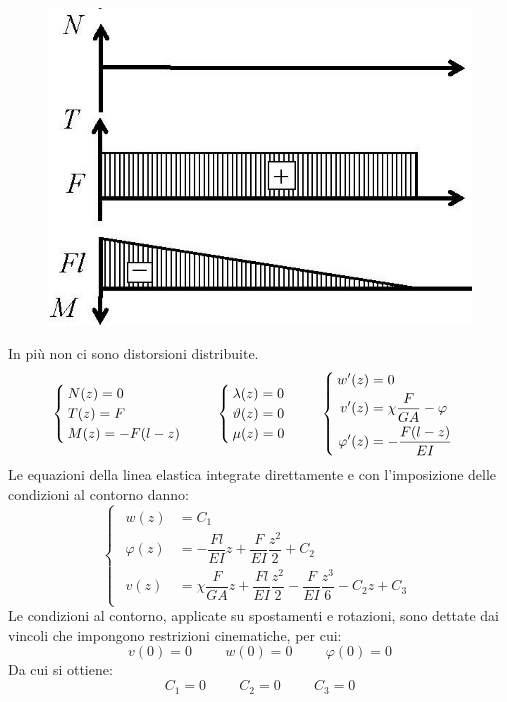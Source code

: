 \documentclass{article}
\begin{document}
\begin{adjustwidth}{2in}{}
\begin{figure}[H]
	\centering
	\includegraphics[width=0.3\linewidth]{"immagini/1.PARTE8_Pagina_13"}
\end{figure}
		In più non ci sono distorsioni distribuite.
		\[
		\begin{cases}
			N(z) = 0 \\
			T(z) = F \\
			M(z) = -F(l-z)
		\end{cases} \hspace{0.5cm} 
		\begin{cases}
			\lambda(z) = 0 \\
			\vartheta(z)= 0 \\
			\mu(z) = 0
		\end{cases} \hspace{0.5cm} 
		\begin{cases}
			\begin{aligned}
				w'(z) & = 0 \\
				v'(z) & = \chi\dfrac{F}{GA} -\varphi \\
				\varphi'(z) & = -\dfrac{F(l-z)}{EI}
			\end{aligned}
		\end{cases}
		\]
		Le equazioni della linea elastica integrate direttamente e con l'imposizione delle condizioni al contorno danno:
		\[ 
		\begin{cases}
			\begin{aligned}
				w(z) & = C_1 \\
				\varphi(z) & = -\dfrac{Fl}{EI}z + \dfrac{F}{EI} \dfrac{z^2}{2} +C_2\\
				v(z) & = \chi\dfrac{F}{GA}z + \dfrac{Fl}{EI} \dfrac{z^2}{2}  - \dfrac{F}{EI} \dfrac{z^3}{6} -C_2z + C_3 			
			\end{aligned}
		\end{cases}
		\]
		Le condizioni al contorno, applicate su spostamenti e rotazioni, sono dettate dai vincoli che impongono restrizioni cinematiche, per cui: 
		\[ v(0) = 0 \hspace{1cm} w(0) = 0 \hspace{1cm} \varphi(0) = 0 \]
		Da cui si ottiene:
		\[ C_1 = 0 \hspace{1cm} C_2 = 0 \hspace{1cm} C_3 = 0 \]

\end{adjustwidth}
\end{document}

